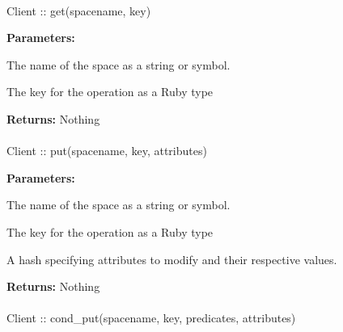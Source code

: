 
\paragraph{}
\begin{ccode}
Client :: get(spacename, key)
\end{ccode}
\funcdesc 

\noindent\textbf{Parameters:}
\begin{description}[labelindent=\widthof{{spacename}},leftmargin=*,noitemsep,nolistsep,align=right]
\item[spacename] The name of the space as a string or symbol.
\item[key] The key for the operation as a Ruby type
\end{description}

\noindent\textbf{Returns:}
Nothing

\paragraph{}
\begin{ccode}
Client :: put(spacename, key, attributes)
\end{ccode}
\funcdesc 

\noindent\textbf{Parameters:}
\begin{description}[labelindent=\widthof{{attributes}},leftmargin=*,noitemsep,nolistsep,align=right]
\item[spacename] The name of the space as a string or symbol.
\item[key] The key for the operation as a Ruby type
\item[attributes] A hash specifying attributes to modify and their respective values.
\end{description}

\noindent\textbf{Returns:}
Nothing

\paragraph{}
\begin{ccode}
Client :: cond_put(spacename, key, predicates, attributes)
\end{ccode}
\funcdesc 

